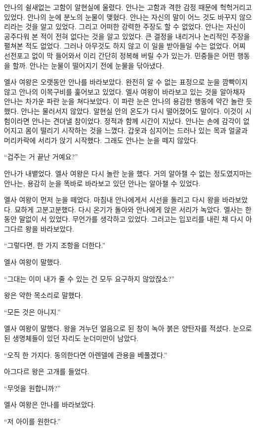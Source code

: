 안나의 쉴새없는 고함이 알현실에 울렸다. 안나는 고함과 격한 감정 때문에 헉헉거리고 있었다. 안나의 눈에 분노의 눈물이 맺혔다. 안나는 자신의 말이 어느 것도 바꾸지 않으리라는 것을 알고 있었다. 그리고 어떠한 강력한 주장도 할 수 없었다. 안나는 자신이 공주다워 본 적이 전혀 없다는 것을 알고 있었다. 큰 결정을 내리거나 논리적인 주장을 펼쳐본 적도 없었다. 그러나 아무것도 하지 않고 이 일을 받아들일 수는 없었다. 어찌 선전포고 없이 막 들어와서 이리 간단히 정복해 버릴 수가 있는가. 민중들은 어떤 행동을 할까. 안나는 눈물이 떨어지기 전에 눈물을 닦아냈다.

엘사 여왕은 오랫동안 안나를 바라보았다. 완전히 알 수 없는 표정으로 눈을 깜빡이지 않고 안나의 이목구비를 훑어보고 있었다. 엘사 여왕이 바라보고 있는 것을 알아채자 안나는 차가운 파란 눈을 쳐다보았다. 이 파란 눈은 안나의 용감한 행동에 약간 놀란 듯했다. 안나는 물러서지 않았다. 알현실 안의 온도가 다시 떨어졌어도 말이다. 이것이 시험이라면 안나는 견뎌낼 참이었다. 정적과 함께 시간이 지났다. 안나는 손에 감각이 없어지고 몸이 떨리기 시작하는 것을 느꼈다. 갑옷과 심지어는 드러나 있는 목과 얼굴과 머리카락에 서리가 앉기 시작했다. 그래도 안나는 눈을 떼지 않았다.

``겁주는 거 끝난 거예요?''

안나가 내뱉었다. 엘사 여왕은 다시 놀란 눈을 했다. 거의 알아챌 수 없는 정도였지마는 안나는, 용감히 눈을 똑바로 바라보고 있던 안나는 알아챌 수 있었다.

엘사 여왕이 먼저 눈을 떼었다. 마침내 안나에게서 시선을 돌리고 다시 왕을 바라보았다. 묘하게 고분고분했다. 다시 온기가 돌아와 안나에게 앉은 서리가 녹았다. 엘사는 한동안 말없이 서 있었다. 무언가를 생각하고 있었다. 그러고는 입꼬리를 내린 채 다시 아그다르 왕을 바라보았다.

``그렇다면, 한 가지 조항을 더한다.''

엘사 여왕이 말했다.

``그대는 이미 내가 줄 수 있는 건 모두 요구하지 않았잖소?''

왕은 약한 목소리로 말했다.

``모든 것은 아니지.''

엘사 여왕이 말했다. 왕을 겨누던 얼음으로 된 창이 녹아 붉은 양탄자를 적셨다. 눈으로 된 생명체들이 있던 자리도 눈더미만이 남았다.

``오직 한 가지다. 동의한다면 아렌델에 관용을 베풀겠다.''

아그다르 왕은 고개를 들었다.

``무엇을 원합니까?''

엘사 여왕은 안나를 바라보았다.

``저 아이를 원한다.''

